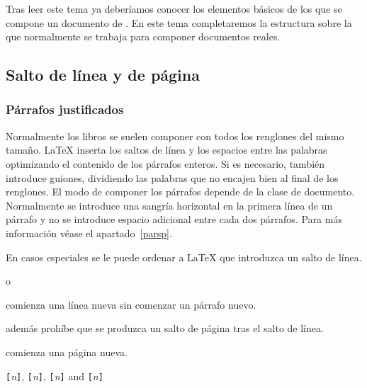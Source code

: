 \begin{intro}

Tras leer este tema ya deberíamos conocer los elementos básicos de los
que se  compone un  documento de \LaTeXe.  En este  tema completaremos
la  estructura  sobre la  que  normalmente  se trabaja  para  componer
documentos reales.

\end{intro}

\subsection{Salto de línea y de página}
 
\subsubsection{Párrafos justificados}

Normalmente los libros se suelen  componer con todos los renglones del
mismo  tamaño. \LaTeX{}  inserta los  saltos de  línea y  los espacios
entre las palabras  optimizando el contenido de  los párrafos enteros.
Si es  necesario, también  introduce guiones, dividiendo  las palabras
que no encajen bien al final de los renglones. El modo de componer los
párrafos depende  de la clase  de documento. Normalmente  se introduce
una  sangría  horizontal en  la  primera  línea  de  un párrafo  y  no
se  introduce espacio  adicional  entre cada  dos  párrafos. Para  más
información véase el apartado~\ref{parsp}.

En casos especiales  se le puede ordenar a \LaTeX{}  que introduzca un
salto de línea.

\begin{command}
\ci{\bs} o  
\end{command}

\noindent comienza una línea nueva sin comenzar un párrafo nuevo.

\begin{command}
\ci{\bs*}
\end{command}

\noindent además  prohíbe que se produzca  un salto de página  tras el
salto de línea.

\begin{command}
\end{command}

\noindent comienza una página nueva. 
\pagebreak

\begin{command}
\verb|[|\emph{n}\verb|]|,
\verb|[|\emph{n}\verb|]|, 
\verb|[|\emph{n}\verb|]| and
\verb|[|\emph{n}\verb|]|
\end{command}

